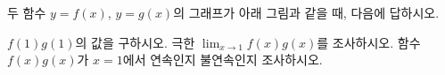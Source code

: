 두 함수 $y=f(x)$, $y=g(x)$의 그래프가 아래 그림과 같을 때, 다음에 답하시오.
\par\smallskip\begin{center}\resizebox{\ifdim\width>\linewidth\linewidth\else\width\fi}{!}{}\end{center}
 $f(1)g(1)$의 값을 구하시오.
 극한 $\displaystyle\lim_{x\to 1} f(x)g(x)$를 조사하시오.
 함수 $f(x)g(x)$가 $x=1$에서 연속인지 불연속인지 조사하시오.
